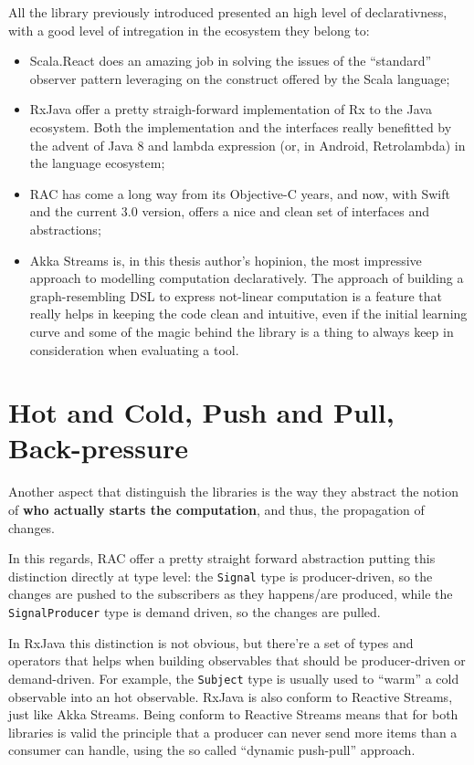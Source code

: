 All the library previously introduced presented an high level of
declarativness, with a good level of intregation in the ecosystem they
belong to:

\begin{itemize}
\itemsep1pt\parskip0pt
\item
  Scala.React does an amazing job in solving the issues of the
  ``standard'' observer pattern leveraging on the construct offered by
  the Scala language;
\item
  RxJava offer a pretty straigh-forward implementation of Rx to the Java
  ecosystem. Both the implementation and the interfaces really
  benefitted by the advent of Java 8 and lambda expression (or, in
  Android, Retrolambda) in the language ecosystem;
\item
  RAC has come a long way from its Objective-C years, and now, with
  Swift and the current 3.0 version, offers a nice and clean set of
  interfaces and abstractions;
\item
  Akka Streams is, in this thesis author's hopinion, the most impressive
  approach to modelling computation declaratively. The approach of
  building a graph-resembling DSL to express not-linear computation is a
  feature that really helps in keeping the code clean and intuitive,
  even if the initial learning curve and some of the magic behind the
  library is a thing to always keep in consideration when evaluating a
  tool.
\end{itemize}

\section{Hot and Cold, Push and Pull,
Back-pressure}\label{hot-and-cold-push-and-pull-back-pressure}

Another aspect that distinguish the libraries is the way they abstract
the notion of \textbf{who actually starts the computation}, and thus,
the propagation of changes.

In this regards, RAC offer a pretty straight forward abstraction putting
this distinction directly at type level: the \texttt{Signal} type is
producer-driven, so the changes are pushed to the subscribers as they
happens/are produced, while the \texttt{SignalProducer} type is demand
driven, so the changes are pulled.

In RxJava this distinction is not obvious, but there're a set of types
and operators that helps when building observables that should be
producer-driven or demand-driven. For example, the \texttt{Subject} type
is usually used to ``warm'' a cold observable into an hot observable.
RxJava is also conform to Reactive Streams, just like Akka Streams.
Being conform to Reactive Streams means that for both libraries is valid
the principle that a producer can never send more items than a consumer
can handle, using the so called ``dynamic push-pull'' approach.

